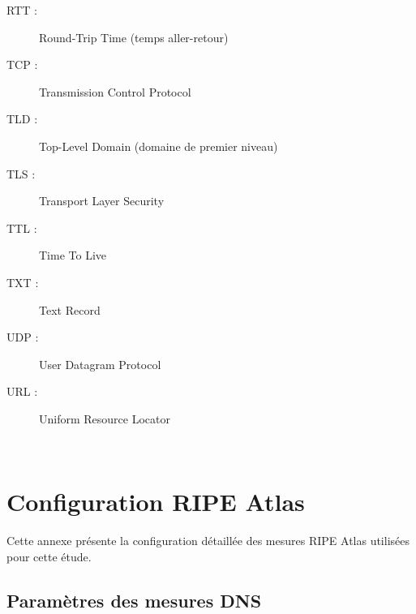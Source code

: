 \documentclass[a4paper,11pt]{book}
\begin{document}
\begin{description}
    \item[RTT :] Round-Trip Time (temps aller-retour)
    \item[TCP :] Transmission Control Protocol
    \item[TLD :] Top-Level Domain (domaine de premier niveau)
    \item[TLS :] Transport Layer Security
    \item[TTL :] Time To Live
    \item[TXT :] Text Record
    \item[UDP :] User Datagram Protocol
    \item[URL :] Uniform Resource Locator
\end{description}

\clearpage\newpage\hbox{ }\clearpage\newpage

\fancyhf{}
\fancyfoot[L]{\nouppercase{\leftmark}}
\fancyfoot[R]{\thepage}
\renewcommand{\headrulewidth}{0pt}
\renewcommand{\footrulewidth}{0.4pt}
\pagestyle{fancy}









\printbibliography[heading=bibintoc,title={Bibliographie}]


\appendix

\chapter{Configuration RIPE Atlas}

Cette annexe présente la configuration détaillée des mesures RIPE Atlas utilisées pour cette étude.

\section{Paramètres des mesures DNS}
\end{document}
